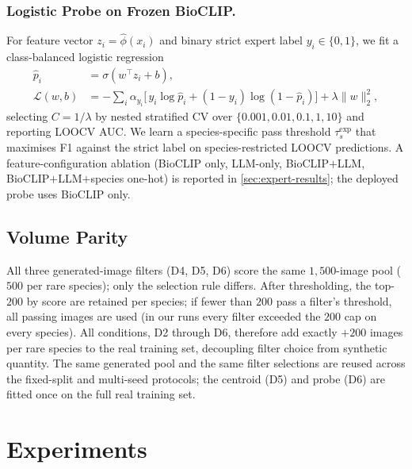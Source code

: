 \documentclass[runningheads]{llncs}
\begin{document}
\subsubsection{Logistic Probe on Frozen BioCLIP.}
For feature vector $z_i = \hat{\phi}(x_i)$ and binary strict expert
label $y_i\in\{0,1\}$, we fit a class-balanced logistic regression
\begin{equation}
\begin{aligned}
  \hat{p}_i &= \sigma(w^\top z_i + b),\\
  \mathcal{L}(w,b)
    &= -\!\sum_i \alpha_{y_i}\!\big[\,y_i\log\hat{p}_i
       + (1{-}y_i)\log(1{-}\hat{p}_i)\big] + \lambda\|w\|_2^2,
\end{aligned}
\end{equation}
selecting $C{=}1/\lambda$ by nested stratified CV over $\{0.001, 0.01,
0.1, 1, 10\}$ and reporting LOOCV AUC. We learn a species-specific pass
threshold $\tau_s^{\mathrm{exp}}$ that maximises F1 against the strict
label on species-restricted LOOCV predictions. A feature-configuration
ablation (BioCLIP only, LLM-only, BioCLIP$+$LLM,
BioCLIP$+$\allowbreak LLM$+$\allowbreak species one-hot) is reported in
\cref{sec:expert-results}; the deployed probe uses BioCLIP only.

\subsection{Volume Parity}
\label{sec:parity}

All three generated-image filters (D4, D5, D6) score the same
$1{,}500$-image pool ($500$ per rare species); only the selection rule
differs. After thresholding, the top-$200$ by score are retained per
species; if fewer than $200$ pass a filter's threshold, all passing
images are used (in our runs every filter exceeded the $200$ cap on
every species). All conditions, D2 through D6, therefore add exactly
$+200$ images per rare species to the real training set, decoupling
filter choice from synthetic quantity. The same generated pool and the
same filter selections are reused across the fixed-split and multi-seed
protocols; the centroid (D5) and probe (D6) are fitted once on the full
real training set.


\section{Experiments}
\label{sec:experiments}
\end{document}
